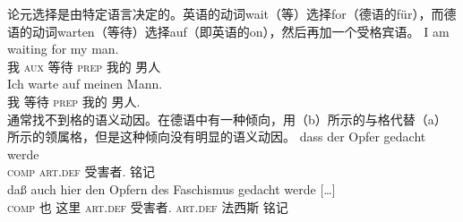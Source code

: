 \begin{exe}
\begin{xlist}[iv.]
\begin{exe}
\begin{xlist}[iv.]
论元选择是由特定语言决定的。英语的动词wait（等）选择for（德语的für），而德语的动词warten（等待）选择auf（即英语的on），然后再加一个受格宾语。
\eal \label{loureed}
\ex 
\gll I am waiting for my man.\\
     我 \textsc{aux} 等待 \textsc{prep} 我的 男人\\
\ex 
\gll Ich warte auf meinen Mann.\\
     我   等待  \textsc{prep}  我的     男人.\acc\\
\zl
通常找不到格的语义动因。在德语中有一种倾向，用（b）所示的与格代替（a）所示的领属格，但是这种倾向没有明显的语义动因。
\eal
\ex 
\gll dass der Opfer gedacht werde\\
     \textsc{comp} \textsc{art}.\textsc{def} 受害者.\gen{} 铭记 \passive{}\\
\ex 
\gll daß auch hier den Opfern des Faschismus gedacht werde [\ldots]\footnotemark\\
     \textsc{comp} 也 这里 \textsc{art}.\textsc{def} 受害者.\dat{} \textsc{art}.\textsc{def} 法西斯 铭记 \passive\\

\end{xlist}
\end{exe}
\end{xlist}
\end{exe}
